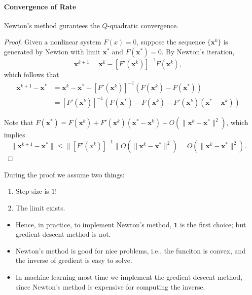 \paragraph{Convergence of Rate}
\begin{proposition}
Newton's method gurantees the $Q$-quadratic convergence.
\end{proposition}
\begin{proof}
Given a nonlinear system $F(x)=0$, suppose the sequence $\{\bm x^k\}$ is generated by Newton with limit $\bm x^*$ and $F(\bm x^*)=0$. By Newton's iteration,
\begin{equation}
\bm x^{k+1} =\bm x^k - [F'(\bm x^k)]^{-1}F(\bm x^k),
\end{equation}
which follows that
\begin{equation}
\begin{aligned}
\bm x^{k+1} - \bm x^* &=  \bm x^k - \bm x^* -  [F'(\bm x^k)]^{-1}\left(F(\bm x^k) - F(\bm x^*)\right)\\
&=[F'(\bm x^k)]^{-1}\left(F(\bm x^*) - F(\bm x^k) - F'(\bm x^k)(\bm x^* - \bm x^k)\right)
\end{aligned}
\end{equation}

Note that $F(\bm x^*) =F(\bm x^k) +F'(\bm x^k)(\bm x^* - \bm x^k)+O(\|\bm x^k-\bm x^*\|^2)$, which implies
\[
\|\bm x^{k+1} - \bm x^*\|\le \|[F'(x^k)]^{-1}\|O(\|\bm x^k - \bm x^*\|^2)
=
O(\|\bm x^k - \bm x^*\|^2).
\]

\end{proof}
\begin{remark}
During the proof we assume two things:
\begin{enumerate}
\item
Step-size is $1$!
\item
The limit exists.
\end{enumerate}
\begin{itemize}
\item
Hence, in practice, to implement Newton's method, $\bm 1$ is the first choice; but gredient descent method is not.
\item
Newton's method is good for nice problems, i.e., the funciton is convex, and the inverse of gredient is easy to solve.
\item
In machine learning most time we implement the gredient descent method, since Newton's method is expensive for computing the inverse.
\end{itemize}
\end{remark}
